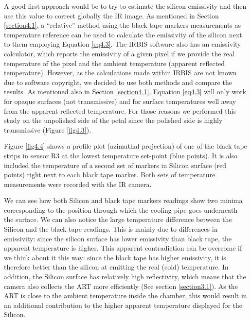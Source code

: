 		A good first approach would be to try to estimate the silicon emissivity and then use this value to correct globally the IR image. As mentioned in Section \ref{section4.1}, a “relative” method using the black tape markers measurements as temperature reference can be used to calculate the emissivity of the silicon next to them employing Equation \ref{eq4.3}. The IRBIS software also has an emissivity calculator, which reports the emissivity of a given pixel if we provide the real temperature of the pixel and the ambient temperature (apparent reflected temperature). However, as the calculations made within IRBIS are not known due to software copyright, we decided to use both methods and compare the results. As mentioned also in Section \ref{section4.1}, Equation \ref{eq4.3} will only work for opaque surfaces (not transmissive) and for surface temperatures well away from the apparent reflected temperature. For those reasons we performed this study on the unpolished side of the petal since the polished side is highly transmissive (Figure \ref{fig4.3}).
		
		Figure \ref{fig4.4} shows a profile plot (azimuthal projection) of one of the black tape strips in sensor R3 at the lowest temperature set-point (blue points). It is also included the temperature of a second set of markers in Silicon surface (red points) right next to each black tape marker. Both sets of temperature measurements were recorded with the IR camera. 
		
		We can see how both Silicon and black tape markers readings show two minima corresponding to the position through which the cooling pipe goes underneath the surface. We can also notice the large temperature difference between the Silicon and the black tape readings. This is mainly due to differences in emissivity: since the silicon surface has lower emissivity than black tape, the apparent temperature is higher. This apparent contradiction can be overcome if we think about it this way: since the black tape has higher emissivity, it is therefore better than the silicon at emitting the real (cold) temperature.
		In addition, the Silicon surface has relatively high reflectivity, which means that the camera also collects the ART more efficiently (See section \ref{section3.1}). As the ART is close to the ambient temperature inside the chamber, this would result in an additional contribution to the higher apparent temperature displayed for the Silicon.
		
